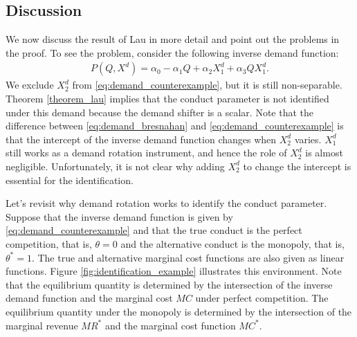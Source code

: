 \documentclass[11pt, a4paper]{article}
\theoremstyle{remark}
\begin{document}
\subsection{Discussion}
We now discuss the result of Lau in more detail and point out the problems in the proof.
To see the problem, consider the following inverse demand function:
\begin{align}
    P(Q, X^{d}) = \alpha_0 - \alpha_1Q + \alpha_2X^{d}_1 + \alpha_3QX^{d}_1. \label{eq:demand_counterexample}
\end{align}
We exclude $X^{d}_2$ from \eqref{eq:demand_counterexample}, but it is still non-separable.
Theorem \ref{theorem_lau} implies that the conduct parameter is not identified under this demand because the demand shifter is a scalar.
Note that the difference between \eqref{eq:demand_bresnahan} and \eqref{eq:demand_counterexample} is that the intercept of the inverse demand function changes when $X^{d}_2$ varies.
$X^{d}_1$ still works as a demand rotation instrument, and hence the role of $X^{d}_2$ is almost negligible. 
Unfortunately, it is not clear why adding $X^{d}_2$ to change the intercept is essential for the identification.


Let's revisit why demand rotation works to identify the conduct parameter.
Suppose that the inverse demand function is given by \eqref{eq:demand_counterexample} and that the true conduct is the perfect competition, that is, $\theta = 0$ and the alternative conduct is the monopoly, that is, $\theta^{*} = 1$.
The true and alternative marginal cost functions are also given as linear functions.
Figure \ref{fig:identification_example} illustrates this environment.
Note that the equilibrium quantity is determined by the intersection of the inverse demand function and the marginal cost $MC$ under perfect competition.
The equilibrium quantity under the monopoly is determined by the intersection of the marginal revenue $MR^{*}$ and the marginal cost function $MC^{*}$.
\end{document}

